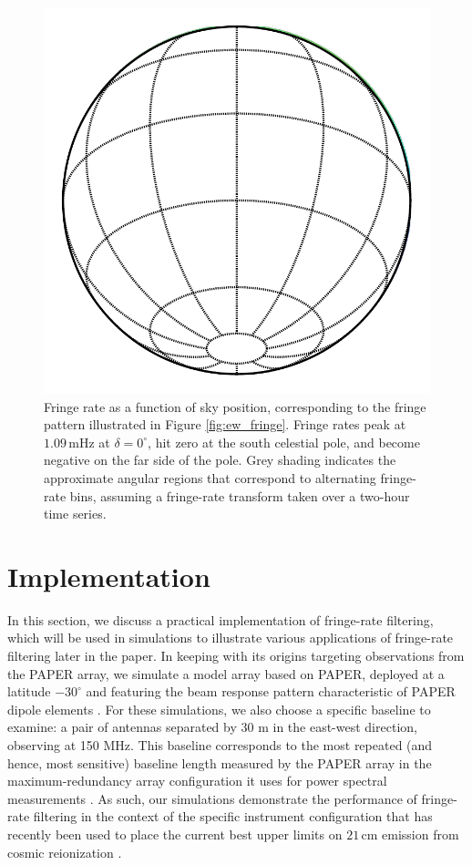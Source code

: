 \documentclass[twocolumn,apj,numberedappendix]{emulateapj}
\begin{document}
\begin{figure}
\includegraphics[width=.9\columnwidth]{plots/fringe_contours}
\caption{
Fringe rate as a function of sky position, corresponding to the fringe pattern illustrated in
Figure \ref{fig:ew_fringe}.  Fringe rates peak at $1.09\,\textrm{mHz}$ at $\delta=0^\circ$, hit zero at
the south celestial pole, and become negative on the far side of the pole.  Grey shading indicates
the approximate angular regions that correspond to alternating fringe-rate bins, assuming a
fringe-rate transform taken over a two-hour time series.
}\label{fig:fringe_contours}
\end{figure}



\section{Implementation}
\label{sec:Implementation}

In this section, we discuss a practical implementation of fringe-rate filtering, which will be used in simulations to illustrate various applications of fringe-rate filtering later in the paper. In keeping with its origins targeting observations from the
PAPER array, we simulate a model array based on PAPER, deployed at a latitude $-30^\circ$
and featuring the beam response pattern characteristic of PAPER dipole elements \citep{parsons_et_al2008,pober_et_al2012}.
For these simulations, we also choose a specific baseline to examine: a pair of antennas separated by 30 m in the 
east-west direction, observing at 150 MHz.  This baseline corresponds to the most repeated (and hence,
most sensitive) baseline length measured by the PAPER array in the maximum-redundancy array configuration it uses
for power spectral measurements \citep{parsons_et_al2012a,P14,ali_et_al2015}.  As such, our simulations demonstrate the performance of fringe-rate filtering in the context of the specific instrument configuration
that has recently been used to place the current best upper limits on $21\,\textrm{cm}$ emission from cosmic reionization \citep{P14,J14}.
\end{document}
